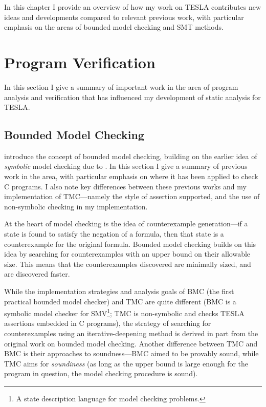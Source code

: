 In this chapter I provide an overview of how my work on TESLA contributes new
ideas and developments compared to relevant previous work, with particular
emphasis on the areas of bounded model checking and SMT methods.

\section{Program Verification} \label{sec:bounded-model-checking}

In this section I give a summary of important work in the area of program
analysis and verification that has influenced my development of static analysis
for TESLA.

\subsection{Bounded Model Checking}

\textcite{biere_symbolic_1999} introduce the concept of bounded model checking,
building on the earlier idea of \emph{symbolic} model checking due to
\textcite{mcmillan_symbolic_1992}. In this section I give a summary of previous
work in the area, with particular emphasis on where it has been applied to check
C programs. I also note key differences between these previous works and my
implementation of TMC---namely the style of assertion supported, and the use of
non-symbolic checking in my implementation.

At the heart of model checking is the idea of counterexample generation---if a
state is found to satisfy the negation of a formula, then that state is a
counterexample for the original formula. Bounded model checking builds on this
idea by searching for counterexamples with an upper bound on their allowable
size. This means that the counterexamples discovered are minimally sized, and
are discovered faster.

While the implementation strategies and analysis goals of BMC
\cite{biere_symbolic_1999} (the first practical bounded model checker) and TMC
are quite different (BMC is a symbolic model checker for SMV\footnote{A state
description language for model checking problems.}; TMC is non-symbolic and
checks TESLA assertions embedded in C programs), the strategy of searching for
counterexamples using an iterative-deepening method is derived in part from the
original work on bounded model checking. Another difference between TMC and BMC
is their approaches to soundness---BMC aimed to be provably sound, while TMC
aims for \emph{soundiness} \cite{livshits_defense_2015} (as long as the upper
bound is large enough for the program in question, the model checking procedure
is sound).

